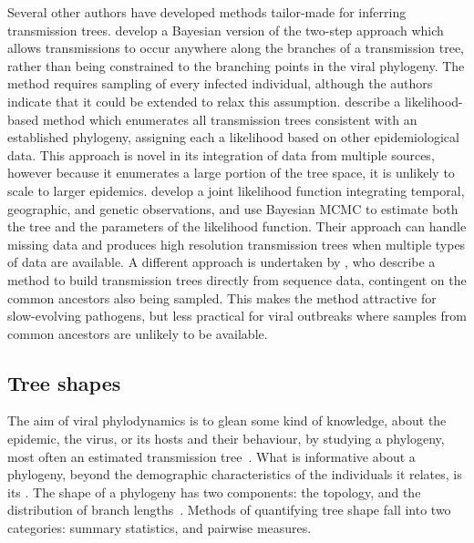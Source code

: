 Several other authors have developed methods tailor-made for inferring
transmission trees. \textcite{didelot2014bayesian} develop a Bayesian version
of the two-step approach which allows transmissions to occur anywhere along the
branches of a transmission tree, rather than being constrained to the branching
points in the viral phylogeny. The method requires sampling of every infected
individual, although the authors indicate that it could be extended to relax
this assumption. \textcite{cottam2008integrating} describe a likelihood-based
method which enumerates all transmission trees consistent with an established
phylogeny, assigning each a likelihood based on other epidemiological data. 
This approach is novel in its integration of data from multiple sources,
however because it enumerates a large portion of the tree space, it is unlikely
to scale to larger epidemics. \textcite{ypma2012unravelling} develop a joint 
likelihood function integrating temporal, geographic, and genetic observations, 
and use Bayesian \gls{MCMC} to estimate both the tree and the parameters of the
likelihood function. Their approach can handle missing data and produces high
resolution transmission trees when multiple types of data are available. A
different approach is undertaken by \textcite{jombart2011reconstructing}, who
describe a method to build transmission trees directly from sequence data,
contingent on the common ancestors also being sampled. This makes the method
attractive for slow-evolving pathogens, but less practical for viral outbreaks
where samples from common ancestors are unlikely to be available.

\subsection{Tree shapes}
\label{subsec:treeshape}

The aim of viral phylodynamics is to glean some kind of knowledge, about the
epidemic, the virus, or its hosts and their behaviour, by studying a phylogeny,
most often an estimated transmission tree~\autocite{pybus2009evolutionary,
volz2013viral}. What is informative about a phylogeny, beyond the demographic
characteristics of the individuals it relates, is its . The shape
of a phylogeny has two components: the topology, and the distribution of branch
lengths~\autocite{mooers1997inferring}. Methods of quantifying tree shape fall
into two categories: summary statistics, and pairwise measures.

